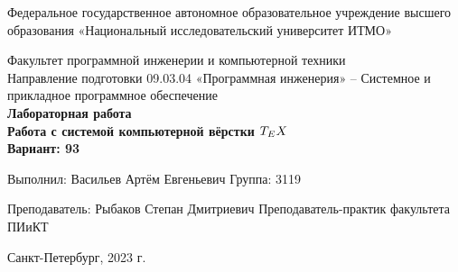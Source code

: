 \documentclass{article}
\begin{document}
\begin{center}
 \LARGE Федеральное государственное автономное образовательное учреждение высшего образования
«Национальный исследовательский университет ИТМО»
\vspace{5cm}

\large Факультет программной инженерии и компьютерной техники\\
Направление подготовки 09.03.04 «Программная инженерия» – Системное и прикладное программное обеспечение\\

\large\bf Лабораторная работа\\

\large\bf Работа с системой компьютерной вёрстки $T_{\Huge E}X$\\

\large Вариант: 93

\end{center}

\vspace{2cm}

\hfill\begin{minipage}{0.35\linewidth}
Выполнил:
Васильев Артём Евгеньевич
Группа: 3119\newline

Преподаватель:
Рыбаков Степан Дмитриевич 
Преподаватель-практик 
факультета ПИиКТ
\end{minipage}
\vfill
\begin{center}
    Санкт-Петербург, 2023 г.
\end{center}
\end{document}
